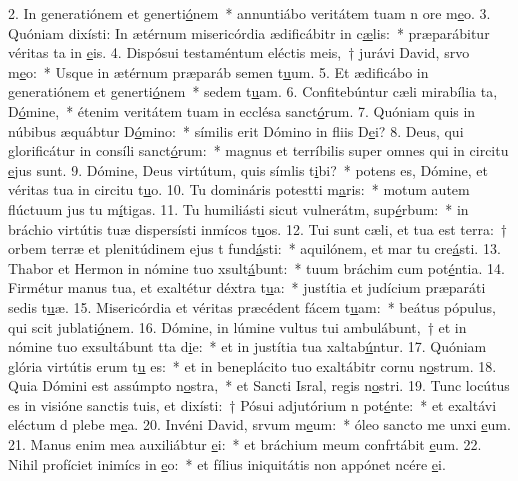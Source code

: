 2. In generatiónem et generti\uline{ó}nem~* annuntiábo veritátem tuam n ore m\uline{e}o.
3. Quóniam dixísti: In ætérnum misericórdia ædificábitr in c\uline{æ}lis:~* præparábitur véritas ta in \uline{e}is.
4. Dispósui testaméntum eléctis meis,~† jurávi David, srvo m\uline{e}o:~* Usque in ætérnum præparáb semen t\uline{u}um.
5. Et ædificábo in generatiónem et generti\uline{ó}nem~* sedem t\uline{u}am.
6. Confitebúntur cæli mirabília ta, D\uline{ó}mine,~* étenim veritátem tuam in ecclésa sanct\uline{ó}rum.
7. Quóniam quis in núbibus æquábtur D\uline{ó}mino:~* símilis erit Dómino in fliis D\uline{e}i?
8. Deus, qui glorificátur in consíli sanct\uline{ó}rum:~* magnus et terríbilis super omnes qui in circitu \uline{e}jus sunt.
9. Dómine, Deus virtútum, quis símlis t\uline{i}bi?~* potens es, Dómine, et véritas tua in circitu t\uline{u}o.
10. Tu domináris potestti m\uline{a}ris:~* motum autem flúctuum jus tu m\uline{í}tigas.
11. Tu humiliásti sicut vulnerátm, sup\uline{é}rbum:~* in bráchio virtútis tuæ dispersísti inmícos t\uline{u}os.
12. Tui sunt cæli, et tua est terra:~† orbem terræ et plenitúdinem ejus t fund\uline{á}sti:~* aquilónem, et mar tu cre\uline{á}sti.
13. Thabor et Hermon in nómine tuo xsult\uline{á}bunt:~* tuum bráchim cum pot\uline{é}ntia.
14. Firmétur manus tua, et exaltétur déxtra t\uline{u}a:~* justítia et judícium præparáti sedis t\uline{u}æ.
15. Misericórdia et véritas præcédent fácem t\uline{u}am:~* beátus pópulus, qui scit jublati\uline{ó}nem.
16. Dómine, in lúmine vultus tui ambulábunt,~† et in nómine tuo exsultábunt tta d\uline{i}e:~* et in justítia tua xaltab\uline{ú}ntur.
17. Quóniam glória virtútis erum t\uline{u} es:~* et in beneplácito tuo exaltábitr cornu n\uline{o}strum.
18. Quia Dómini est assúmpto n\uline{o}stra,~* et Sancti Isral, regis n\uline{o}stri.
19. Tunc locútus es in visióne sanctis tuis, et dixísti:~† Pósui adjutórium n pot\uline{é}nte:~* et exaltávi eléctum d plebe m\uline{e}a.
20. Invéni David, srvum m\uline{e}um:~* óleo sancto me unxi \uline{e}um.
21. Manus enim mea auxiliábtur \uline{e}i:~* et bráchium meum confrtábit \uline{e}um.
22. Nihil profíciet inimícs in \uline{e}o:~* et fílius iniquitátis non appónet ncére \uline{e}i.
